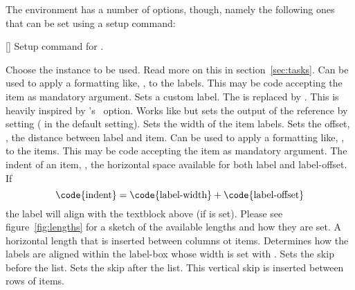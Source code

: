 \documentclass{tasks-manual}
\begin{document}
The environment  has a number of options, though, namely the
following ones that can be set using a setup command:
\begin{commands}
  []
    Setup command for \Tasks.
\end{commands}
\begin{options}
  \Default
     Choose the instance to be used.  Read more on this in
     section~\ref{sec:tasks}.
  \Default
    Can be used to apply a formatting like, \eg,
     to the labels.  This may be code accepting the item as
    mandatory argument.
    Sets a custom label.  The \code{*} is replaced by
    .  This is heavily inspired by
    's~\cite{pkg:enumitem}  option.
  \Default
    Works like  but sets the output of the
    reference by setting  ( in the default
    setting).
  \Default{1em}
    Sets the width of the item labels.
  \Default{.3333em}
    Sets the offset, \ie, the distance between label and
    item.
  \Default
    Can be used to apply a formatting like, \eg,
     to the items. This may be code accepting the item as
    mandatory argument.
  \Default{2.5em}
    The indent of an item, \ie, the horizontal space
    available for both label and label-offset.  If
    \[
      \text{\code{indent}} =
      \text{\code{label-width}} + \text{\code{label-offset}}
    \]
    the label will align with the textblock above (if
     is set).  Please see figure~\ref{fig:lengths}
    for a sketch of the available lengths and how they are set.
  \Default{0pt}
    A horizontal length that is inserted between columns ot
    items.
    Determines how the labels are aligned within the
    label-box whose width is set with .
    Sets the skip before the list.
    Sets the skip after the list.
    This vertical skip is inserted between rows of items.

\end{options}
\end{document}
